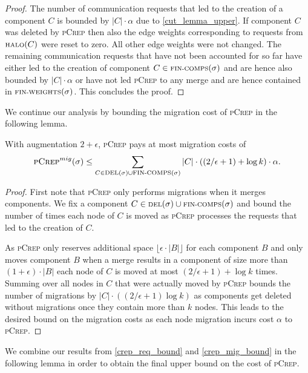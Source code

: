 \documentclass[a4paper,UKenglish,cleveref, autoref, thm-restate,authorcolumns]{lipics-v2019}
\newcommand{\adjDel}{\textsc{pCrep}}
\newcommand{\del}{\text{\scriptsize DEL}}
\newcommand{\halo}{\text{\scriptsize HALO}}
\newcommand{\finalComps}{\text{\scriptsize FIN-COMPS}}
\newcommand{\finalWeights}{\text{\scriptsize FIN-WEIGHTS}}
\begin{document}
\begin{proof}
	The number of communication requests that led to the creation of a component $C$ is bounded by $|C|\cdot\alpha$ due to \cref{cut_lemma_upper}.
	If component $C$ was deleted by \adjDel{} then also the edge weights corresponding to requests from $\halo(C)$ were reset to zero. All other edge weights were not changed. The remaining communication requests that have not been accounted for so far have either led to the creation of component $C\in\finalComps(\sigma)$ and are hence also bounded by $|C|\cdot\alpha$ or have not led \adjDel{} to any merge and are hence contained in $\finalWeights(\sigma)$. This concludes the proof.
\end{proof}

We continue our analysis by bounding the migration cost of \adjDel{} in the following lemma.

\begin{lemma}
	\label{crep_mig_bound}
	With augmentation $2+\epsilon$, \adjDel{} pays at most migration costs of
	\begin{align*}
	\adjDel^{mig}(\sigma)\leq\sum_{C\in\del{}(\sigma)\cup\finalComps(\sigma)}|C|\cdot((2/\epsilon+1)+\log k)\cdot\alpha.
	\end{align*}
\end{lemma}

\begin{proof}
	First note that \adjDel{} only performs migrations when it merges components.
	We fix a component $C\in\del{}(\sigma)\cup \finalComps(\sigma)$ and bound the number of times each node of $C$ is moved as \adjDel{} processes the requests that led to the creation of $C$. 
	
	As \adjDel{} only reserves additional space $\lfloor\epsilon\cdot|B|\rfloor$ for each component $B$ and only moves component $B$ when a merge results in a component of size more than $(1+\epsilon)\cdot|B|$ each node of $C$ is moved at most
	$(2/\epsilon+1)+\log k$ times. Summing over all nodes in $C$ that were actually moved by \adjDel{} bounds the number of migrations by $|C|\cdot((2/\epsilon+1) \log k)$ as components get deleted without migrations once they contain more than $k$ nodes. This leads to the desired bound on the migration costs as each node migration incurs cost $\alpha$ to \adjDel{}.
\end{proof}


We combine our results from \cref{crep_req_bound} and \cref{crep_mig_bound} in the following lemma in order to obtain the final upper bound on the cost of \adjDel{}.
\end{document}
